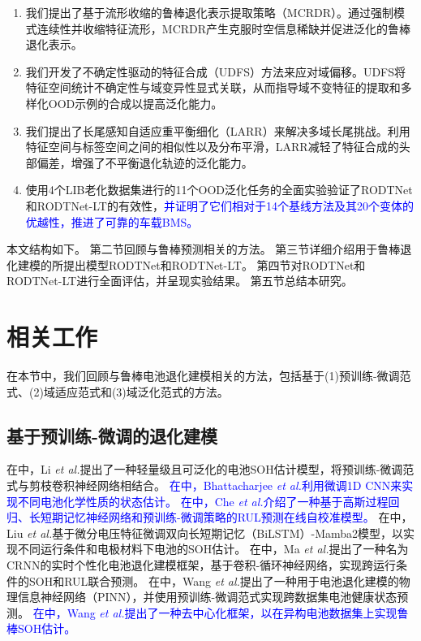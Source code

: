 \documentclass[UTF8,lettersize,journal]{IEEEtran}
\newcommand{\rev}[1]{\textcolor{blue}{#1}}
\begin{document}
\begin{enumerate}
\item 我们提出了基于流形收缩的鲁棒退化表示提取策略（MCRDR）。通过强制模式连续性并收缩特征流形，MCRDR产生克服时空信息稀缺并促进泛化的鲁棒退化表示。
\item 我们开发了不确定性驱动的特征合成（UDFS）方法来应对域偏移。UDFS将特征空间统计不确定性与域变异性显式关联，从而指导域不变特征的提取和多样化OOD示例的合成以提高泛化能力。
\item 我们提出了长尾感知自适应重平衡细化（LARR）来解决多域长尾挑战。利用特征空间与标签空间之间的相似性以及分布平滑，LARR减轻了特征合成的头部偏差，增强了不平衡退化轨迹的泛化能力。
\item 使用4个LIB老化数据集进行的11个OOD泛化任务的全面实验验证了RODTNet和RODTNet-LT的有效性，\rev{并证明了它们相对于14个基线方法及其20个变体的优越性，推进了可靠的车载BMS。}
\end{enumerate}

本文结构如下。
第二节回顾与鲁棒预测相关的方法。
第三节详细介绍用于鲁棒退化建模的所提出模型RODTNet和RODTNet-LT。
第四节对RODTNet和RODTNet-LT进行全面评估，并呈现实验结果。
第五节总结本研究。

\section{相关工作}

在本节中，我们回顾与鲁棒电池退化建模相关的方法，包括基于(1)预训练-微调范式、(2)域适应范式和(3)域泛化范式的方法。

\subsection{基于预训练-微调的退化建模}

在\cite{LI2021116410}中，Li \emph{et al.}提出了一种轻量级且可泛化的电池SOH估计模型，将预训练-微调范式与剪枝卷积神经网络相结合。
\rev{在\cite{9372902}中，Bhattacharjee \emph{et al.}利用微调1D CNN来实现不同电池化学性质的状态估计。}
\rev{在\cite{9343713}中，Che \emph{et al.}介绍了一种基于高斯过程回归、长短期记忆神经网络和预训练-微调策略的RUL预测在线自校准模型。}
在\cite{LIU2025115347}中，Liu \emph{et al.}基于微分电压特征微调双向长短期记忆（BiLSTM）-Mamba2模型，以实现不同运行条件和电极材料下电池的SOH估计。
在\cite{D2EE01676A}中，Ma \emph{et al.}提出了一种名为CRNN的实时个性化电池退化建模框架，基于卷积-循环神经网络，实现跨运行条件的SOH和RUL联合预测。
在\cite{wang2024physics}中，Wang \emph{et al.}提出了一种用于电池退化建模的物理信息神经网络（PINN），并使用预训练-微调范式实现跨数据集电池健康状态预测。
\rev{在\cite{10886998}中，Wang \emph{et al.}提出了一种去中心化框架，以在异构电池数据集上实现鲁棒SOH估计。}
\end{document}
